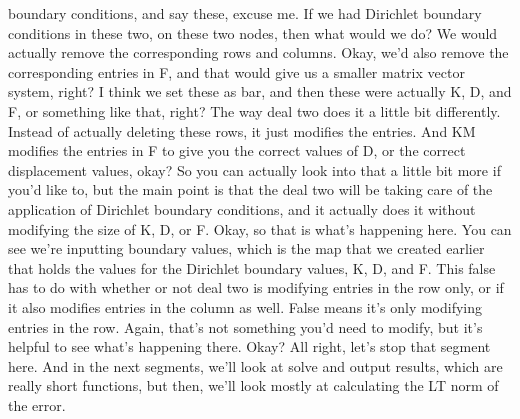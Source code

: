 \documentclass[10pt]{article}
\begin{document}
{boundary conditions, and say these, excuse me. If we had Dirichlet boundary conditions in these two, on these two nodes, then what would we do? We would actually remove the corresponding rows and columns. Okay, we'd also remove the corresponding entries in F, and that would give us a smaller matrix vector system, right? I think we set these as bar, and then these were actually K, D, and F, or something like that, right? The way deal two does it a little bit differently. Instead of actually deleting these rows, it just modifies the entries. And KM modifies the entries in F to give you the correct values of D, or the correct displacement values, okay? So you can actually look into that a little bit more if you'd like to, but the main point is that the deal two will be taking care of the application of Dirichlet boundary conditions, and it actually does it without modifying the size of K, D, or F. Okay, so that is what's happening here. You can see we're inputting boundary values, which is the map that we created earlier that holds the values for the Dirichlet boundary values, K, D, and F. This false has to do with whether or not deal two is modifying entries in the row only, or if it also modifies entries in the column as well. False means it's only modifying entries in the row. Again, that's not something you'd need to modify, but it's helpful to see what's happening there. Okay? All right, let's stop that segment here. And in the next segments, we'll look at solve and output results, which are really short functions, but then, we'll look mostly at calculating the LT norm of the error.

}
\end{document}
